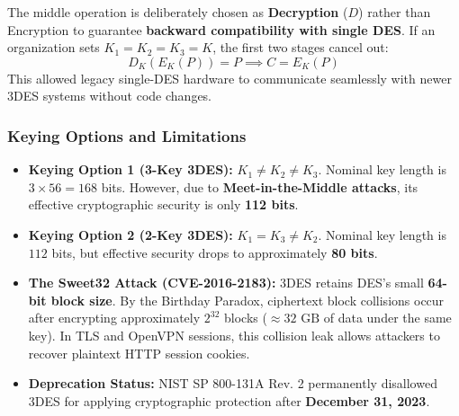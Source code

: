 \begin{tcolorbox}[colback=green!5!white,colframe=green!60!black,title=\textbf{Examination Rule: Why Encrypt-Decrypt-Encrypt (EDE) Instead of EEE?}]
The middle operation is deliberately chosen as \textbf{Decryption} ($D$) rather than Encryption to guarantee \textbf{backward compatibility with single DES}. If an organization sets $K_1 = K_2 = K_3 = K$, the first two stages cancel out:
\[ D_K(E_K(P)) = P \implies C = E_K(P) \]
This allowed legacy single-DES hardware to communicate seamlessly with newer 3DES systems without code changes.
\end{tcolorbox}

\subsubsection{Keying Options and Limitations}

\begin{itemize}
\item \textbf{Keying Option 1 (3-Key 3DES):} $K_1 \neq K_2 \neq K_3$. Nominal key length is $3 \times 56 = 168$ bits. However, due to \textbf{Meet-in-the-Middle attacks}, its effective cryptographic security is only \textbf{112 bits}.
\item \textbf{Keying Option 2 (2-Key 3DES):} $K_1 = K_3 \neq K_2$. Nominal key length is $112$ bits, but effective security drops to approximately \textbf{80 bits}.
\item \textbf{The Sweet32 Attack (CVE-2016-2183):} 3DES retains DES's small \textbf{64-bit block size}. By the Birthday Paradox, ciphertext block collisions occur after encrypting approximately $2^{32}$ blocks ($\approx 32\text{ GB}$ of data under the same key). In TLS and OpenVPN sessions, this collision leak allows attackers to recover plaintext HTTP session cookies.
\item \textbf{Deprecation Status:} NIST SP 800-131A Rev. 2 permanently disallowed 3DES for applying cryptographic protection after \textbf{December 31, 2023}.
\end{itemize}

